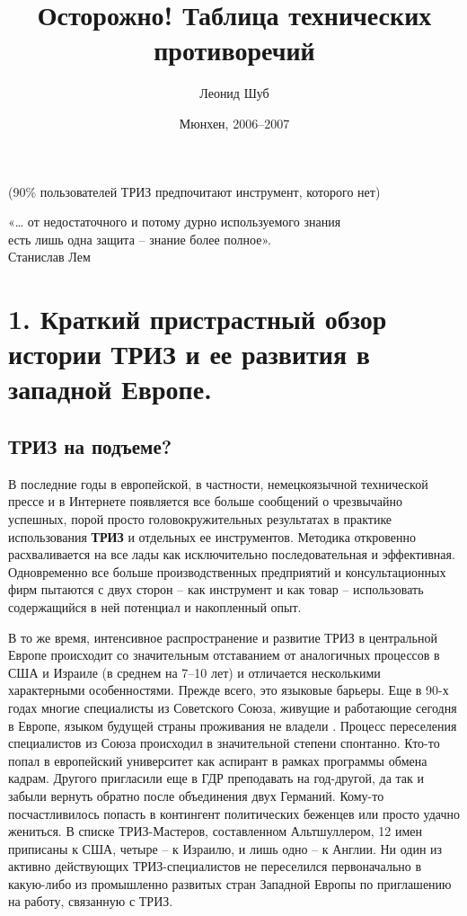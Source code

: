 \documentclass[11pt,a4paper]{article}
\title{Осторожно! Таблица технических противоречий}
\author{Леонид Шуб}
\date{Мюнхен, 2006--2007}
\begin{document}
\maketitle

(90\% пользователей ТРИЗ предпочитают инструмент, которого нет)

\begin{flushright}
  «… от недостаточного и потому дурно используемого знания\\ есть лишь одна
  защита -- знание более полное».\\ Станислав Лем
\end{flushright}
\section*{1. Краткий пристрастный обзор истории ТРИЗ и ее развития в западной
  Европе.} 

\subsection*{ТРИЗ на подъеме?}

В последние годы в европейской, в частности, немецкоязычной технической прессе
и в Интернете появляется все больше сообщений о чрезвычайно успешных, порой
просто головокружительных результатах в практике использования \textbf{ТРИЗ} и
отдельных ее инструментов. Методика откровенно расхваливается на все лады как
исключительно последовательная и эффективная. Одновременно все больше
производственных предприятий и консультационных фирм пытаются с двух сторон --
как инструмент и как товар -- использовать содержащийся в ней потенциал и
накопленный опыт.

В то же время, интенсивное распространение и развитие ТРИЗ в центральной
Европе происходит со значительным отставанием от аналогичных процессов в США и
Израиле (в среднем на 7--10 лет) и отличается несколькими характерными
особенностями. Прежде всего, это языковые барьеры. Еще в 90-х годах многие
специалисты из Советского Союза, живущие и работающие сегодня в Европе, языком
будущей страны проживания не владели \cite{Shub2004}. Процесс переселения
специалистов из Союза происходил в значительной степени спонтанно. Кто-то
попал в европейский университет как аспирант в рамках программы обмена кадрам.
Другого пригласили еще в ГДР преподавать на год-другой, да так и забыли
вернуть обратно после объединения двух Германий. Кому-то посчастливилось
попасть в контингент политических беженцев или просто удачно жениться. В
списке ТРИЗ-Мастеров, составленном Альтшуллером, 12 имен приписаны к США,
четыре -- к Израилю, и лишь одно -- к Англии. Ни один из активно действующих
ТРИЗ-специалистов не переселился первоначально в какую-либо из промышленно
развитых стран Западной Европы по приглашению на работу, связанную с ТРИЗ.
\end{document}
